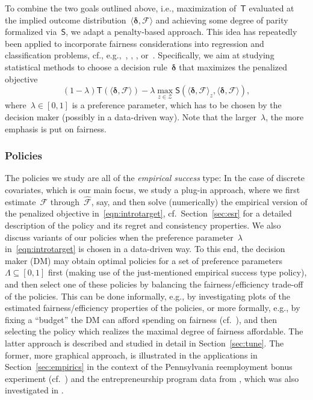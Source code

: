 \documentclass[11pt, a4paper]{article}
\theoremstyle{definition}
\begin{document}
To combine the two goals outlined above, i.e., maximization of~$\mathsf{T}$ evaluated at the implied outcome distribution~$\langle \bm{\delta}, \mathcal{F} \rangle$ and achieving some degree of parity formalized via~$\mathsf{S}$, we adapt a penalty-based approach. This idea has repeatedly been applied to incorporate fairness considerations into  regression and classification problems, cf., e.g.,~\cite{kamishima2011}, \cite{Kamishima2012}, \cite{berk2017convex}, or~\cite{bechavod2017penalizing}. Specifically, we aim at studying statistical methods to choose a decision rule~$\bm{\delta}$ that maximizes the penalized objective
\begin{equation}\label{eqn:introtarget}
(1-\lambda) \mathsf{T}(\langle \bm{\delta}, \mathcal{F} \rangle) - \lambda \max_{z \in \mathcal{Z}} \mathsf{S}\left(\langle \bm{\delta}, \mathcal{F} \rangle_z, \langle \bm{\delta}, \mathcal{F} \rangle\right),
\end{equation}
%
where~$\lambda \in [0, 1]$ is a preference parameter, which has to be chosen by the decision maker (possibly in a data-driven way). Note that the larger~$\lambda$, the more emphasis is put on fairness.

\subsubsection{Policies}

The policies we study are all of the \emph{empirical success} type: In the case of discrete covariates, which is our main focus, we study a plug-in approach, where we first estimate~$\mathcal{F}$ through~$\hat{\mathcal{F}}$, say, and then solve (numerically) the empirical version of the penalized objective in~\eqref{eqn:introtarget}, cf.~Section~\ref{sec:esr} for a detailed description of the policy and its regret and consistency properties. We also discuss variants of our policies when the preference parameter~$\lambda$ in~\eqref{eqn:introtarget} is chosen in a data-driven way. To this end, the decision maker (DM) may obtain optimal policies for a set of preference parameters~$\Lambda \subseteq [0, 1]$ first (making use of the just-mentioned empirical success type policy), and then select one of these policies by balancing the fairness/efficiency trade-off of the policies. This can be done informally, e.g., by investigating plots of the estimated fairness/efficiency properties of the policies, or more formally, e.g., by fixing a ``budget'' the DM can afford spending on fairness (cf.~\cite{berk2017convex}), and then selecting the policy which realizes the maximal degree of fairness affordable. The latter approach is described and studied in detail in Section~\ref{sec:tune}. The former, more graphical approach, is illustrated in the applications in Section~\ref{sec:empirics} in the context of the Pennsylvania reemployment bonus experiment (cf.~\cite{bilias}) and the entrepreneurship program data from \cite{lyonszhang}, which was also investigated in \cite{vivbra}. 
\end{document}
